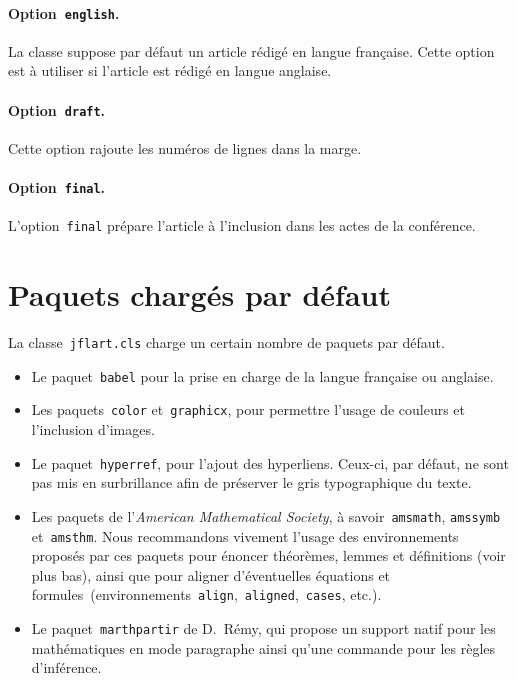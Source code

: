 \documentclass{jflart}
\begin{document}
\paragraph{Option~\texttt{english}.}

La classe suppose par défaut un article rédigé en langue française.
%
Cette option est à utiliser si l'article est rédigé en langue anglaise.

\paragraph{Option~\texttt{draft}.}

Cette option rajoute les numéros de lignes dans la marge.

\paragraph{Option~\texttt{final}.}

L'option~\texttt{final} prépare l'article à l'inclusion dans les actes de la
conférence.

\section{Paquets chargés par défaut}

La classe~\texttt{jflart.cls} charge un certain nombre de paquets par défaut.
%
\begin{itemize}
\item
  Le paquet~\texttt{babel} pour la prise en charge de la langue française ou
  anglaise.

\item
  Les paquets~\texttt{color} et~\texttt{graphicx}, pour permettre l'usage de
  couleurs et l'inclusion d'images.

\item
  Le paquet~\texttt{hyperref}, pour l'ajout des hyperliens.
  Ceux-ci, par défaut, ne sont pas mis en surbrillance afin de préserver le gris
  typographique du texte.

\item
  Les paquets de l'\emph{American Mathematical Society}, à
  savoir~\texttt{amsmath}, \texttt{amssymb} et~\texttt{amsthm}.
  Nous recommandons vivement l'usage des environnements proposés par ces paquets
  pour énoncer théorèmes, lemmes et définitions (voir plus bas), ainsi que pour
  aligner d'éventuelles équations et
  formules~(environnements~\texttt{align},~\texttt{aligned},~\texttt{cases},
  etc.).

\item
  Le paquet~\texttt{marthpartir} de D.~Rémy, qui propose un support natif pour
  les mathématiques en mode paragraphe ainsi qu'une commande pour les règles
  d'inférence.

\end{itemize}
\end{document}

